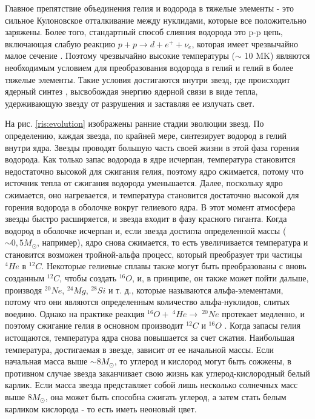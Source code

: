 \documentclass[%
master,    %
natbib,      %
subf,        %
href,        %
colorlinks,  %
]{disser}
\begin{document}
Главное препятствие объединения гелия и водорода в тяжелые элементы - это сильное Кулоновское отталкивание между нуклидами, которые все положительно заряжены. Более того, стандартный способ слияния водорода это p-p цепь, включающая слабую реакцию $p + p \rightarrow d + e^+ + \nu_e$, которая имеет чрезвычайно малое сечение \cite{cauldrons}. Поэтому чрезвычайно высокие температуры ($\sim$ 10 MK) являются необходимым условием для преобразования водорода в гелий и гелий в более тяжелые элементы. Такие условия достигаются внутри звезд, где происходит ядерный синтез \cite{energy}, высвобождая энергию ядерной связи в виде тепла, удерживающую звезду от разрушения и заставляя ее излучать свет.

На рис. \ref{ris:evolution} изображены ранние стадии эволюции звезд. По определению, каждая звезда, по крайней мере, синтезирует водород в гелий внутри ядра. Звезды проводят большую часть своей жизни в этой фаза горения водорода. Как только запас водорода в ядре исчерпан, температура становится недостаточно высокой для сжигания гелия, поэтому ядро сжимается, потому что источник тепла от сжигания водорода уменьшается. Далее, поскольку ядро сжимается, оно нагревается, и температура становится достаточно высокой для горения водорода в оболочке вокруг гелиевого ядра. В этот момент атмосфера звезды быстро расширяется, и звезда входит в фазу красного гиганта. Когда водород в оболочке исчерпан и, если звезда достигла определенной массы ($\sim 0,5 M_\odot$, например), ядро снова сжимается, то есть увеличивается температура и становится возможен тройной-альфа процесс, который  преобразует три частицы $^4He$ в $^{12}C$. Некоторые гелиевые сплавы также могут быть преобразованы с вновь созданным $^{12}C$, чтобы создать $^{16}O$, и, в принципе, он также может пойти дальше, производя $^{20}Ne$, $^{24}Mg$, $^{28}Si$ и т. д., которые называются альфа-элементами, потому что они являются определенным количество альфа-нуклидов, слитых воедино. Однако на практике реакция $^{16}O + \ ^4He \rightarrow \ ^{20}Ne$ протекает медленно, и поэтому сжигание гелия в основном производит $^{12}C$ и $^{16}O$ \cite{interiors}. Когда запасы гелия истощаются, температура ядра снова повышается за счет сжатия. Наибольшая температура, достигаемая в звезде, зависит от ее начальной массы. Если начальная масса выше $\sim 8 M_\odot$, то углерод и кислород могут быть сожжены, в противном случае звезда заканчивает свою жизнь как углерод-кислородный белый карлик. Если масса звезда представляет собой лишь несколько солнечных масс выше $8 M_\odot$, она может быть способна сжигать углерод, а затем стать белым карликом кислорода - то есть иметь неоновый цвет.
\end{document}
